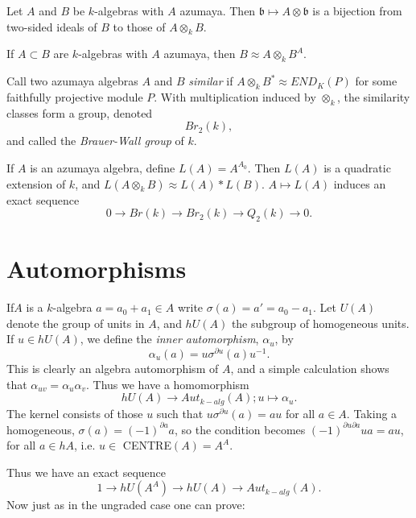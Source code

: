 \setcounter{coro}{1}
\begin{coro}%
Let $A$ and $B$ be $k$-algebras with $A$ azumaya. Then
  $\mathfrak{b} \mapsto A \otimes \mathfrak{b}$ is a bijection from
  two-sided ideals of $B$ to those of $A \otimes_k B$. 
\end{coro}

\begin{coro}%
If $A \subset B$ are $k$-algebras with $A$ azumaya, then $B
  \approx A \otimes_k B^A$. 
\end{coro}

Call two azumaya algebras $A$ and $B$ \textit{similar} if $A
\otimes_k  B^* \approx END_K (P)$ for some faithfully projective
module $P$. With multiplication induced by $\otimes_k$, the similarity
classes form a group, denoted 
$$
Br_2 (k), 
$$
and called the \textit{Brauer-Wall group} of $k$.

\setcounter{theorem}{3}
\begin{theorem}%
If $A$ is an azumaya algebra, define $ L(A)= A^{A_0}$. Then $L
  (A)$ is a quadratic extension of $k$, and $L (A \otimes_k B) 
  \approx L(A) \ast L(B)$. $A \mapsto L(A)$ induces an exact sequence  
$$
0 \to Br (k) \to Br_2 (k) \to Q_2 (k) \to 0.
$$
\end{theorem}


\section{Automorphisms}\label{chap4:sec5}%

If\pageoriginale $A$ is a $k$-algebra $a=a_0 + a_1 \in A$
write $\sigma(a) 
= a' = a_0 - a_1$. Let $U(A)$ denote the group of units in $A$, and
$hU(A)$ the subgroup of homogeneous units. If $u \in hU(A)$, we define
the \textit{inner automorphism}, $\alpha_u$, by   
$$
\alpha_u (a) = u \sigma^{\partial u}(a) u^{-1}.  
$$
This is clearly an algebra automorphism of $A$, and a simple
calculation shows that $\alpha_{uv}= \alpha_u \alpha_v$. Thus we have
a homomorphism  
$$
hU(A) \to Aut_{k-alg}(A) ; u \mapsto \alpha_u. 
$$ 
The kernel consists of those $u$ such that $u \sigma^{\partial u}(a) =
au $ for all $a \in A$. Taking a homogeneous, $\sigma (a) =
(-1)^{\partial a}a$, so the condition becomes $(-1)^{\partial u
  \partial a} ua = au$, for all $a \in hA$, i.e. $u
\in$  CENTRE$(A)=A^A$.  

Thus we have an exact sequence 
\begin{equation*}
1 \to hU (A^A)\to hU(A) \to Aut_{k-alg} (A).\tag{5.1}\label{eq5.1}
\end{equation*}
Now just as in the ungraded case one can prove:

